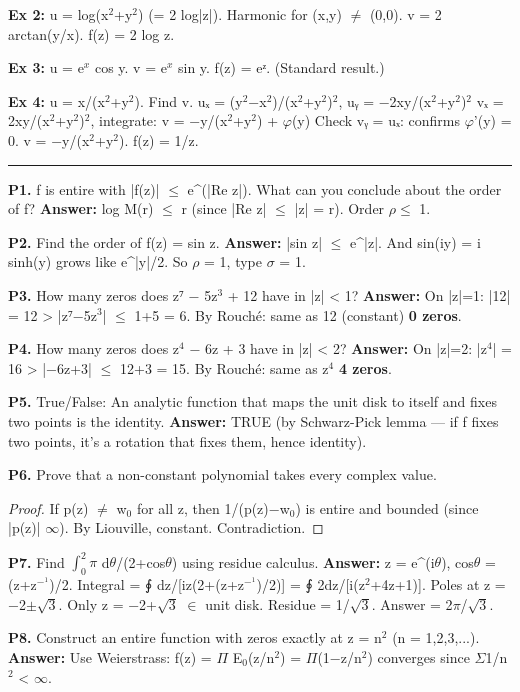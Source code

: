 \documentclass[12pt,a4paper,openany]{book}
\begin{document}
{{\textbf{Ex 2:} u = log(x$^2$+y$^2$) (= 2 log|z|). Harmonic for (x,y) $\neq$ (0,0).
v = 2 arctan(y/x). f(z) = 2 log z.

\textbf{Ex 3:} u = e$^x$ cos y. v = e$^x$ sin y. f(z) = eᶻ. (Standard result.)

\textbf{Ex 4:} u = x/(x$^2$+y$^2$). Find v.
uₓ = (y$^2$−x$^2$)/(x$^2$+y$^2$)$^2$, uᵧ = −2xy/(x$^2$+y$^2$)$^2$
vₓ = 2xy/(x$^2$+y$^2$)$^2$, integrate: v = −y/(x$^2$+y$^2$) + $\varphi$(y)
Check vᵧ = uₓ: confirms $\varphi$'(y) = 0. v = −y/(x$^2$+y$^2$).
f(z) = 1/z. 

\bigskip\noindent\rule{\textwidth}{0.4pt}\bigskip


\textbf{P1.} f is entire with |f(z)| $\leq$ e^(|Re z|). What can you conclude about the order of f?
\textbf{Answer:} log M(r) $\leq$ r (since |Re z| $\leq$ |z| = r). Order $\rho\leq$ 1.

\textbf{P2.} Find the order of f(z) = sin z.
\textbf{Answer:} |sin z| $\leq$ e^|z|. And sin(iy) = i sinh(y) grows like e^|y|/2. So $\rho$ = 1, type $\sigma$ = 1.

\textbf{P3.} How many zeros does z⁷ − 5z$^3$ + 12 have in |z| < 1?
\textbf{Answer:} On |z|=1: |12| = 12 > |z⁷−5z$^3$| $\leq$ 1+5 = 6. By Rouché: same as 12 (constant)  \textbf{0 zeros}.

\textbf{P4.} How many zeros does z$^4$ − 6z + 3 have in |z| < 2?
\textbf{Answer:} On |z|=2: |z$^4$| = 16 > |−6z+3| $\leq$ 12+3 = 15. By Rouché: same as z$^4$  \textbf{4 zeros}.

\textbf{P5.} True/False: An analytic function that maps the unit disk to itself and fixes two points is the identity.
\textbf{Answer:} TRUE (by Schwarz-Pick lemma — if f fixes two points, it's a rotation that fixes them, hence identity).

\textbf{P6.} Prove that a non-constant polynomial takes every complex value.
\begin{proof}
If p(z) $\neq$ w$_0$ for all z, then 1/(p(z)−w$_0$) is entire and bounded (since |p(z)|  $\infty$). By Liouville, constant. Contradiction.
\end{proof}

\textbf{P7.} Find $\int_0^2\pi$ d$\theta$/(2+cos$\theta$) using residue calculus.
\textbf{Answer:} z = e^(i$\theta$), cos$\theta$ = (z+z$^{-}^1$)/2. Integral = ∮ dz/[iz(2+(z+z$^{-}^1$)/2)] = ∮ 2dz/[i(z$^2$+4z+1)].
Poles at z = −2$\pm$$\sqrt{3}$. Only z = −2+$\sqrt{3}$ $\in$ unit disk. Residue = 1/$\sqrt{3}$. Answer = 2$\pi$/$\sqrt{3}$.

\textbf{P8.} Construct an entire function with zeros exactly at z = n$^2$ (n = 1,2,3,...).
\textbf{Answer:} Use Weierstrass: f(z) = $\Pi$ E$_0$(z/n$^2$) = $\Pi$(1−z/n$^2$) converges since $\Sigma$1/n$^2$ < $\infty$.

}}
\end{document}
